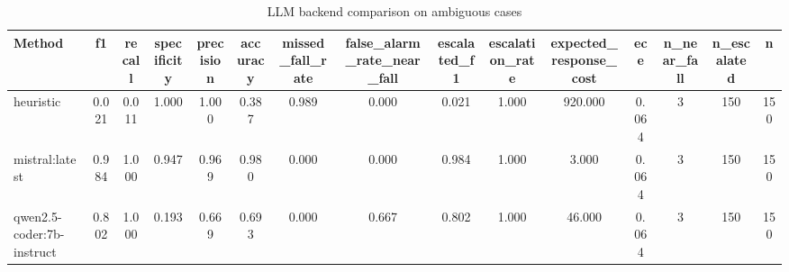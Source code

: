 \begin{table}[t]
\centering
\caption{LLM backend comparison on ambiguous cases}
\begin{tabular}{lcccccccccccccc}
\toprule
Method & f1 & recall & specificity & precision & accuracy & missed_fall_rate & false_alarm_rate_near_fall & escalated_f1 & escalation_rate & expected_response_cost & ece & n_near_fall & n_escalated & n \\
\midrule
heuristic & 0.021 & 0.011 & 1.000 & 1.000 & 0.387 & 0.989 & 0.000 & 0.021 & 1.000 & 920.000 & 0.064 & 3 & 150 & 150 \\
mistral:latest & 0.984 & 1.000 & 0.947 & 0.969 & 0.980 & 0.000 & 0.000 & 0.984 & 1.000 & 3.000 & 0.064 & 3 & 150 & 150 \\
qwen2.5-coder:7b-instruct & 0.802 & 1.000 & 0.193 & 0.669 & 0.693 & 0.000 & 0.667 & 0.802 & 1.000 & 46.000 & 0.064 & 3 & 150 & 150 \\
\bottomrule
\end{tabular}
\end{table}